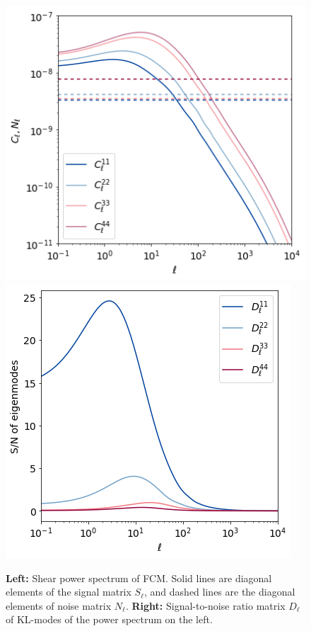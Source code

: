 \documentclass[twocolumn]{\docclass}
\newcommand\full{FCM}
\begin{document}
	\begin{figure}[thbp]
		\includegraphics[width=0.7\columnwidth]{Cl_pst.png}
		\qquad \qquad \qquad
		\includegraphics[width=0.7\columnwidth]{Dl_pst.png}
		\caption{\textbf{Left:} Shear power spectrum of \full. Solid lines are diagonal elements of the signal matrix $S_{\ell}$, and dashed lines are the diagonal elements of noise matrix $N_{\ell}$.
			\textbf{Right:} Signal-to-noise ratio matrix $D_\ell$ of KL-modes of the power spectrum on the left.  \label{fig:ClDl}}
	\end{figure}
	
\end{document}
